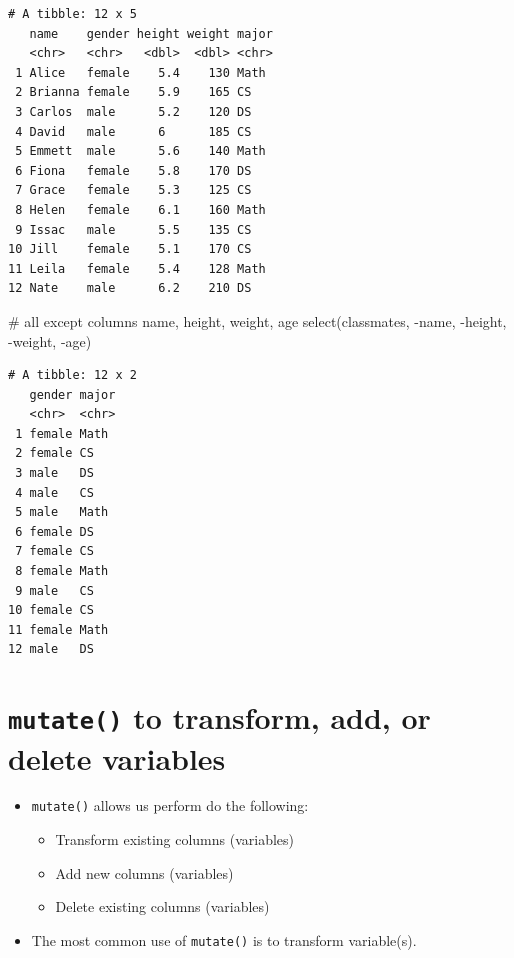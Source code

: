 \documentclass[
  letterpaper,
  DIV=11,
  numbers=noendperiod]{scrreprt}
\newenvironment{Shaded}{\begin{snugshade}}{\end{snugshade}}
\newcommand{\CommentTok}[1]{\textcolor[rgb]{0.37,0.37,0.37}{#1}}
\newcommand{\FunctionTok}[1]{\textcolor[rgb]{0.28,0.35,0.67}{#1}}
\newcommand{\NormalTok}[1]{\textcolor[rgb]{0.00,0.23,0.31}{#1}}
\newcommand{\SpecialCharTok}[1]{\textcolor[rgb]{0.37,0.37,0.37}{#1}}
\providecommand{\tightlist}{%
  \setlength{\itemsep}{0pt}\setlength{\parskip}{0pt}}\usepackage{longtable,booktabs,array}
\begin{document}
\begin{tcolorbox}
\begin{verbatim}
# A tibble: 12 x 5
   name    gender height weight major
   <chr>   <chr>   <dbl>  <dbl> <chr>
 1 Alice   female    5.4    130 Math 
 2 Brianna female    5.9    165 CS   
 3 Carlos  male      5.2    120 DS   
 4 David   male      6      185 CS   
 5 Emmett  male      5.6    140 Math 
 6 Fiona   female    5.8    170 DS   
 7 Grace   female    5.3    125 CS   
 8 Helen   female    6.1    160 Math 
 9 Issac   male      5.5    135 CS   
10 Jill    female    5.1    170 CS   
11 Leila   female    5.4    128 Math 
12 Nate    male      6.2    210 DS   
\end{verbatim}

\begin{Shaded}
\begin{Highlighting}[]
\CommentTok{\# all except columns name, height, weight, age}
\FunctionTok{select}\NormalTok{(classmates, }\SpecialCharTok{{-}}\NormalTok{name, }\SpecialCharTok{{-}}\NormalTok{height, }\SpecialCharTok{{-}}\NormalTok{weight, }\SpecialCharTok{{-}}\NormalTok{age)}
\end{Highlighting}
\end{Shaded}

\begin{verbatim}
# A tibble: 12 x 2
   gender major
   <chr>  <chr>
 1 female Math 
 2 female CS   
 3 male   DS   
 4 male   CS   
 5 male   Math 
 6 female DS   
 7 female CS   
 8 female Math 
 9 male   CS   
10 female CS   
11 female Math 
12 male   DS   
\end{verbatim}

\end{tcolorbox}

\section{\texorpdfstring{\texttt{mutate()} to transform, add, or delete
variables}{mutate() to transform, add, or delete variables}}\label{mutate-to-transform-add-or-delete-variables}

\begin{itemize}
\tightlist
\item
  \texttt{mutate()} allows us perform do the following:

  \begin{itemize}
  \tightlist
  \item
    Transform existing columns (variables)
  \item
    Add new columns (variables)
  \item
    Delete existing columns (variables)
  \end{itemize}
\item
  The most common use of \texttt{mutate()} is to transform variable(s).
\end{itemize}
\end{document}
